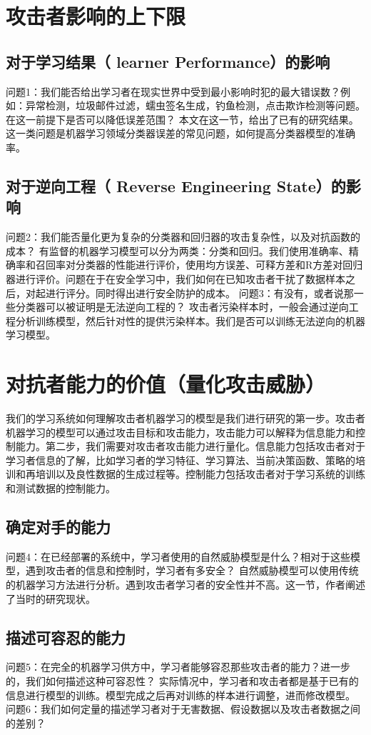 \documentclass[UTF8]{ctexart}
\begin{document}
	\section{攻击者影响的上下限}\label{sec:disanjie}
    \subsection{对于学习结果（ learner Performance）的影响}
    问题1：我们能否给出学习者在现实世界中受到最小影响时犯的最大错误数？例如：异常检测，垃圾邮件过滤，蠕虫签名生成，钓鱼检测，点击欺诈检测等问题。在这一前提下是否可以降低误差范围？
    本文在这一节，给出了已有的研究结果。这一类问题是机器学习领域分类器误差的常见问题，如何提高分类器模型的准确率。

    \subsection{对于逆向工程（ Reverse Engineering State）的影响}
    问题2：我们能否量化更为复杂的分类器和回归器的攻击复杂性，以及对抗函数的成本？
    有监督的机器学习模型可以分为两类：分类和回归。我们使用准确率、精确率和召回率对分类器的性能进行评价，使用均方误差、可释方差和R方差对回归器进行评价。问题在于在安全学习中，我们如何在已知攻击者干扰了数据样本之后，对起进行评分。同时得出进行安全防护的成本。
    问题3：有没有，或者说那一些分类器可以被证明是无法逆向工程的？
    攻击者污染样本时，一般会通过逆向工程分析训练模型，然后针对性的提供污染样本。我们是否可以训练无法逆向的机器学习模型。
	\clearpage
	\section{对抗者能力的价值（量化攻击威胁）}\label{sec:disijie}
	我们的学习系统如何理解攻击者机器学习的模型是我们进行研究的第一步。攻击者机器学习的模型可以通过攻击目标和攻击能力，攻击能力可以解释为信息能力和控制能力。第二步，我们需要对攻击者攻击能力进行量化。信息能力包括攻击者对于学习者信息的了解，比如学习者的学习特征、学习算法、当前决策函数、策略的培训和再培训以及良性数据的生成过程等。控制能力包括攻击者对于学习系统的训练和测试数据的控制能力。
    \subsection{确定对手的能力}
    问题4：在已经部署的系统中，学习者使用的自然威胁模型是什么？相对于这些模型，遇到攻击者的信息和控制时，学习者有多安全？
   	自然威胁模型可以使用传统的机器学习方法进行分析。遇到攻击者学习者的安全性并不高。这一节，作者阐述了当时的研究现状。
    \subsection{描述可容忍的能力}
    问题5：在完全的机器学习供方中，学习者能够容忍那些攻击者的能力？进一步的，我们如何描述这种可容忍性？
    实际情况中，学习者和攻击者都是基于已有的信息进行模型的训练。模型完成之后再对训练的样本进行调整，进而修改模型。
    问题6：我们如何定量的描述学习者对于无害数据、假设数据以及攻击者数据之间的差别？
\end{document}
